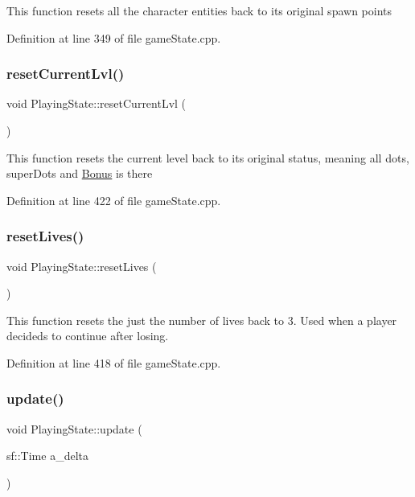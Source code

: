 This function resets all the character entities back to its original spawn points 

Definition at line 349 of file game\+State.\+cpp.

\mbox{\label{class_playing_state_a11a3e0a2d479e659c442deb9c87fdeed}} 
\subsubsection{\texorpdfstring{reset\+Current\+Lvl()}{resetCurrentLvl()}}
{\footnotesize\ttfamily void Playing\+State\+::reset\+Current\+Lvl (\begin{DoxyParamCaption}{ }\end{DoxyParamCaption})}

This function resets the current level back to its original status, meaning all dots, super\+Dots and \hyperlink{class_bonus}{Bonus} is there 

Definition at line 422 of file game\+State.\+cpp.

\mbox{\label{class_playing_state_a464c879dc893195b041efa58b3b3e73f}} 
\subsubsection{\texorpdfstring{reset\+Lives()}{resetLives()}}
{\footnotesize\ttfamily void Playing\+State\+::reset\+Lives (\begin{DoxyParamCaption}{ }\end{DoxyParamCaption})}

This function resets the just the number of lives back to 3. Used when a player decideds to continue after losing. 

Definition at line 418 of file game\+State.\+cpp.

\mbox{\label{class_playing_state_a62b3904b8a971fed2f8fab4eb73bd9e5}} 
\subsubsection{\texorpdfstring{update()}{update()}}
{\footnotesize\ttfamily void Playing\+State\+::update (\begin{DoxyParamCaption}\item[{sf\+::\+Time}]{a\+\_\+delta }\end{DoxyParamCaption})\hspace{0.3cm}{\ttfamily [virtual]}}

